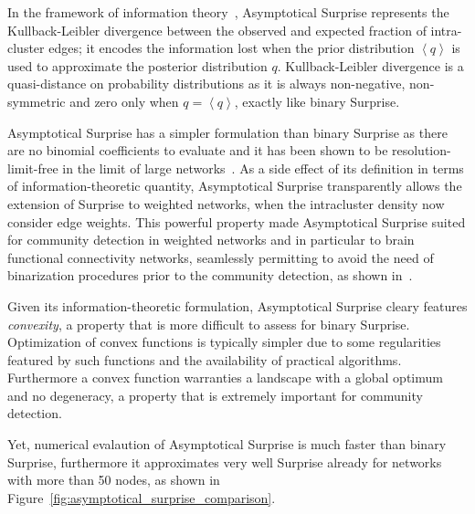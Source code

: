 In the framework of information theory~\cite{cover2006}, Asymptotical Surprise represents the Kullback-Leibler divergence between the observed and expected fraction of intra-cluster edges; it encodes the information lost when the prior distribution $\left <q \right >$ is used to approximate the posterior distribution $q$. Kullback-Leibler divergence is a quasi-distance on probability distributions as it is always non-negative, non-symmetric and zero only when $q=\left< q \right>$, exactly like binary Surprise.

Asymptotical Surprise has a simpler formulation than binary Surprise as there are no binomial coefficients to evaluate and it has been shown to be resolution-limit-free in the limit of large networks~\cite{traag2015}. As a side effect of its definition in terms of information-theoretic quantity, Asymptotical Surprise transparently allows the extension of Surprise to weighted networks, when the intracluster density now consider edge weights.
This powerful property made Asymptotical Surprise suited for community detection in weighted networks and in particular to brain functional connectivity networks, seamlessly permitting to avoid the need of binarization procedures prior to the community detection, as shown in~\cite{nicolini2017}.

Given its information-theoretic formulation, Asymptotical Surprise cleary features \emph{convexity}, a property that is more difficult to assess for binary Surprise. Optimization of convex functions is typically simpler due to some regularities featured by such functions and the availability of practical algorithms. Furthermore a convex function warranties a landscape with a global optimum and no degeneracy, a property that is extremely important for community detection.

Yet, numerical evalaution of Asymptotical Surprise is much faster than binary Surprise, furthermore it approximates very well Surprise already for networks with more than 50 nodes, as shown in Figure~\ref{fig:asymptotical_surprise_comparison}.

